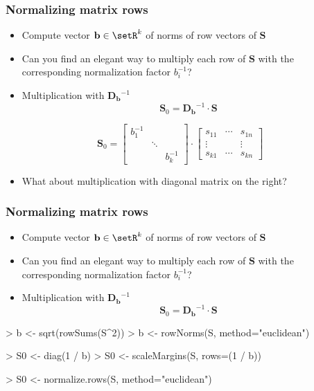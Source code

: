 \documentclass[t]{beamer} %
\begin{document}
\begin{frame}
  \frametitle{Normalizing matrix rows}
  
  \begin{itemize}
  \item Compute vector $\mathbf{b} \in \setR^k$ of norms of row vectors of $\mathbf{S}$
  \item Can you find an elegant way to multiply each row of $\mathbf{S}$ with the corresponding normalization factor $b_i^{-1}$?
  \item<2-> Multiplication with  $\mathbf{D_b}^{-1}$
    \[
    \mathbf{S}_0 = \mathbf{D_b}^{-1} \cdot \mathbf{S}
    \]
  \end{itemize}
  
  \ungap[1]
  \[
  \mathbf{S}_0 =
  \begin{bmatrix}
    b_1^{-1} & & \\
    & \ddots & \\
    & & b_k^{-1}
  \end{bmatrix}
  \cdot
  \begin{bmatrix}
    s_{11} & \cdots & s_{1n} \\
    \vdots & & \vdots \\
    s_{k1} & \cdots & s_{kn}
  \end{bmatrix}
  \]

  \begin{itemize}
  \item[\hand] What about multiplication with diagonal matrix on the right?
  \end{itemize}
\end{frame}

\begin{frame}[fragile]
  \frametitle{Normalizing matrix rows}
  
  \begin{itemize}
  \item Compute vector $\mathbf{b} \in \setR^k$ of norms of row vectors of $\mathbf{S}$
  \item Can you find an elegant way to multiply each row of $\mathbf{S}$ with the corresponding normalization factor $b_i^{-1}$?
  \item Multiplication with  $\mathbf{D_b}^{-1}$
    \[
    \mathbf{S}_0 = \mathbf{D_b}^{-1} \cdot \mathbf{S}
    \]
  \end{itemize}
  
\begin{Rcode}
> b <- sqrt(rowSums(S^2))
> b <- rowNorms(S, method="euclidean") 

> S0 <- diag(1 / b) %
> S0 <- scaleMargins(S, rows=(1 / b))  

> S0 <- normalize.rows(S, method="euclidean") 
\end{Rcode}
\end{frame}
\end{document}
